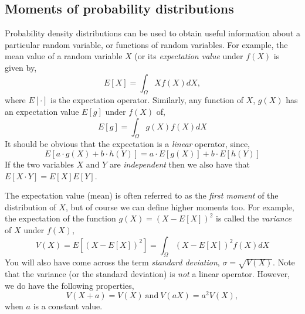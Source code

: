 \subsection{Moments of probability distributions}

Probability density distributions can be used to obtain useful information about a particular random variable, or functions of random variables. For example, the mean value of a random variable $X$ (or its \emph{expectation value} under $f(X)$ is given by, 
\begin{equation}\label{eqn:expectation}
    E[X] = \int_{\Omega} Xf(X)dX,
\end{equation}
where $E[\cdot]$ is the expectation operator. 
Similarly, any function of $X$, $g(X)$ has an expectation value $E[g]$ under $f(X)$ of,
\begin{equation}
    E[g] = \int_{\Omega} g(X)f(X)dX
\end{equation}
It should be obvious that the expectation is a \emph{linear} operator, since, 
\begin{equation}\label{eqn:linearexpectation}
    E[a\cdot g(X)+b\cdot h(Y)] = a\cdot E[g(X)]+b\cdot E[h(Y)]
\end{equation}
If the two variables $X$ and $Y$ are \emph{independent} then we also have that $ E[X\cdot Y] = E[X] E[Y]$.

The expectation value (mean) is often referred to as the \emph{first moment} of the distribution of $X$, but of course we can define higher moments too. For example, the expectation of the function $g(X)=(X-E[X])^{2}$ is called the \emph{variance} of $X$ under $f(X)$, 
\begin{equation}\label{eqn:variance}
    V(X) = E[(X-E[X])^{2}] = \int_{\Omega} (X-E[X])^2f(X)dX
\end{equation}
You will also have come across the term \emph{standard deviation}, $\sigma = \sqrt{V(X)}$. Note that the variance (or the standard deviation) is \emph{not} a linear operator. However, we do have the following properties, 
\begin{equation}
 V(X+a) = V(X) ~\mathrm{and}~ V(aX)=a^{2}V(X),
\end{equation}
when $a$ is a constant value. 

